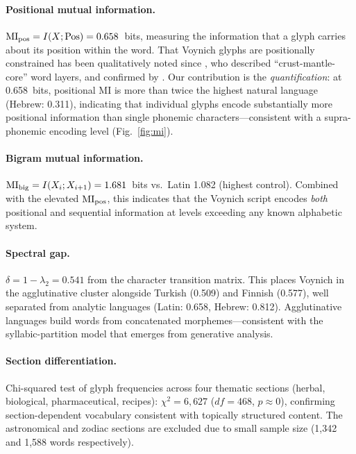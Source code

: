 \paragraph{Positional mutual information.}
$\mathrm{MI}_{\text{pos}} = I(X; \text{Pos}) = 0.658$~bits, measuring the information that a glyph carries about its position within the word.  That Voynich glyphs are positionally constrained has been qualitatively noted since \citet{stolfi1997}, who described ``crust-mantle-core'' word layers, and confirmed by \citet{bowern2021}.  Our contribution is the \emph{quantification}: at 0.658~bits, positional MI is more than twice the highest natural language (Hebrew: 0.311), indicating that individual glyphs encode substantially more positional information than single phonemic characters---consistent with a supra-phonemic encoding level (Fig.~\ref{fig:mi}).

\paragraph{Bigram mutual information.}
$\mathrm{MI}_{\text{big}} = I(X_i; X_{i+1}) = 1.681$~bits vs.\ Latin 1.082 (highest control).  Combined with the elevated $\mathrm{MI}_{\text{pos}}$, this indicates that the Voynich script encodes \emph{both} positional and sequential information at levels exceeding any known alphabetic system.

\paragraph{Spectral gap.}
$\delta = 1 - \lambda_2 = 0.541$ from the character transition matrix.  This places Voynich in the agglutinative cluster alongside Turkish (0.509) and Finnish (0.577), well separated from analytic languages (Latin: 0.658, Hebrew: 0.812).  Agglutinative languages build words from concatenated morphemes---consistent with the syllabic-partition model that emerges from generative analysis.

\paragraph{Section differentiation.}
Chi-squared test of glyph frequencies across four thematic sections (herbal, biological, pharmaceutical, recipes): $\chi^2 = 6{,}627$ ($df = 468$, $p \approx 0$), confirming section-dependent vocabulary consistent with topically structured content.  The astronomical and zodiac sections are excluded due to small sample size (1,342 and 1,588 words respectively).

